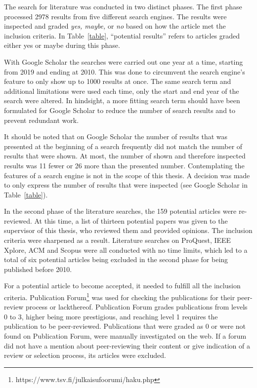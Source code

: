 \documentclass[utf8,english]{gradu3}
\begin{document}
\clearpage

The search for literature was conducted in two distinct phases.
The first phase processed 2978 results from five different search engines.
The results were inspected and graded \textit{yes, maybe,} or \textit{no}
based on how the article met the inclusion criteria.
In Table~\ref{table}, ``potential results'' refers to
articles graded either yes or maybe during this phase.

With Google Scholar the searches were carried out one year at a time, starting from 2019 and ending at 2010.
This was done to circumvent the search engine's feature to only show up to 1000 results at once.
The same search term and additional limitations were used each time, only the start and end year of the search were altered.
In hindsight, a more fitting search term should have been formulated for Google Scholar to reduce the
number of search results and to prevent redundant work.

It should be noted that on Google Scholar the number of results that was presented at the beginning of a search
frequently did not match the number of results that were shown.
At most, the number of shown and therefore inspected results was 11 fewer or 26 more
than the presented number. Contemplating the features of a search engine is not in the scope of this
thesis. A decision was made to only express the number of results
that were inspected (see Google Scholar in Table~\ref{table}).

In the second phase of the literature searches, the 159 potential articles were re-reviewed.
At this time, a list of thirteen potential papers was given to the supervisor of this thesis,
who reviewed them and provided opinions. The inclusion criteria were sharpened as a result.
Literature searches on ProQuest, IEEE Xplore, ACM and Scopus were all conducted with no time limits,
which led to a total of six potential articles being excluded in the second phase for being published before 2010.

For a potential article to become accepted, it needed to fulfill all the inclusion criteria.
Publication Forum\footnote{https://www.tsv.fi/julkaisufoorumi/haku.php}
was used for checking the publications for their peer-review process or lackthereof.
Publication Forum grades publications from levels 0 to 3, higher being more prestigious, and
reaching level 1 requires the publication to be peer-reviewed. Publications that were graded
as 0 or were not found on Publication Forum, were manually investigated on the web.
If a forum did not have a mention about peer-reviewing their content or give indication
of a review or selection process, its articles were excluded.
\end{document}
